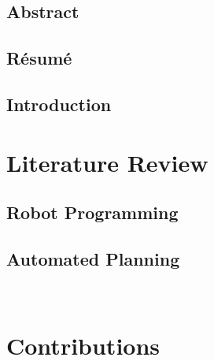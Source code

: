 \documentclass[a4paper,12pt,twoside,openany]{book}
\theoremstyle{definition}
\theoremstyle{remark}
\begin{document}
%


%

\cleardoublepage
\chapter*{Abstract}


\chapter*{R\'{e}sum\'{e}}



\dominitoc%
\tableofcontents
\listoffigures


\chapter{Introduction} \label{chap:Intro}
\minitoc%

\part{Literature Review}\label{part1}
 \cleardoublepage
\chapter{Robot Programming}\label{chap:Sota}
\minitoc%


\cleardoublepage
\chapter{Automated Planning}\label{chap:Sota-AP}
\minitoc%
\

\cleardoublepage
\part{Contributions}\label{part2}
\cleardoublepage
\end{document}
